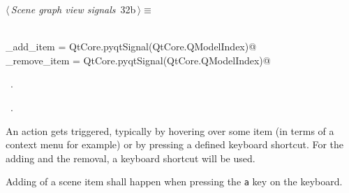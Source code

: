 \documentclass[
    a4paper,      %
    10pt,         %
    openright,    %
    notitlepage,  %
    parskip=half, %
]{scrreprt}       %
\theoremstyle{definition}                    %
\begin{document}
\begin{flushleft} \small
\begin{minipage}{\linewidth}\label{scrap37}\raggedright\small
{} $\langle\,${\itshape Scene graph view signals}\nobreak\ {\footnotesize {32b}}$\,\rangle\equiv$
\vspace{-1exm}
\begin{list}{}{} \item
\mbox{}\lstinline@@\\
\mbox{}\lstinline@do_add_item = QtCore.pyqtSignal(QtCore.QModelIndex)@\\
\mbox{}\lstinline@do_remove_item = QtCore.pyqtSignal(QtCore.QModelIndex)@\\
\mbox{}\lstinline@@{\NWsep}
\end{list}
\vspace{-1.5ex}
\footnotesize
\begin{list}{}{\setlength{\itemsep}{-\parsep}\setlength{\itemindent}{-\leftmargin}}
\item \NWtxtMacroDefBy\ .
\item \NWtxtMacroRefIn\ .

\item{}
\end{list}
\end{minipage}\vspace{4ex}
\end{flushleft}
An action gets triggered, typically by hovering over some item (in terms of a
context menu for example) or by pressing a defined keyboard shortcut. For the
adding and the removal, a keyboard shortcut will be used.

Adding of a scene item shall happen when pressing the \verb=a= key on the
keyboard.
\end{document}
